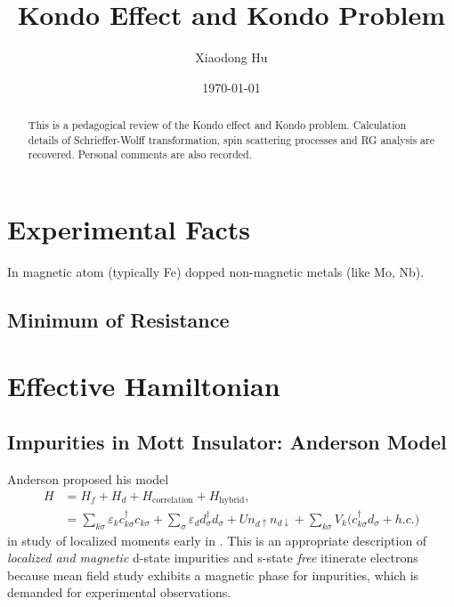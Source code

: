 \documentclass[aps,prx,superscriptaddress,onecolumn,preprintnumbers,nofootinbib,longbibliography]{revtex4-1}
\begin{document}
\title{Kondo Effect and Kondo Problem}%

\author{Xiaodong Hu}

\date{\today}


\begin{abstract}
	This is a pedagogical review of the Kondo effect and Kondo problem. Calculation details of Schrieffer-Wolff transformation, spin scattering processes and RG analysis are recovered. Personal comments are also recorded.
\end{abstract}
\maketitle
\tableofcontents


\section{Experimental Facts}
	In magnetic atom (typically Fe) dopped non-magnetic metals (like Mo, Nb).
	\subsection{Minimum of Resistance}
		

\section{Effective Hamiltonian}
	\subsection{Impurities in Mott Insulator: Anderson Model} 
		Anderson proposed his model
		\begin{align}
			H&=H_f+H_d+H_{\text{correlation}}+H_{\text{hybrid}},\nonumber\\
			&=\sum_{k \sigma}\varepsilon_kc_{k\sigma}^\dagger c_{k\sigma}+\sum_{\sigma}\varepsilon_d d_{\sigma}^\dagger d_{\sigma}+Un_{d\uparrow}n_{d\downarrow}+\sum_{k\sigma}V_k\big(c_{k\sigma}^\dagger d_{\sigma}+h.c.\big)\label{1.1.1}
		\end{align}
		in study of localized moments early in \cite{anderson1961localized}. This is an appropriate description of \emph{localized and magnetic} d-state  impurities and s-state \emph{free} itinerate electrons because mean field study exhibits a magnetic phase for impurities, which is demanded for experimental observations.
\end{document}
